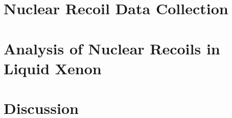 \section{Nuclear Recoil Data Collection}


\section{Analysis of Nuclear Recoils in Liquid Xenon}


\section{Discussion}



